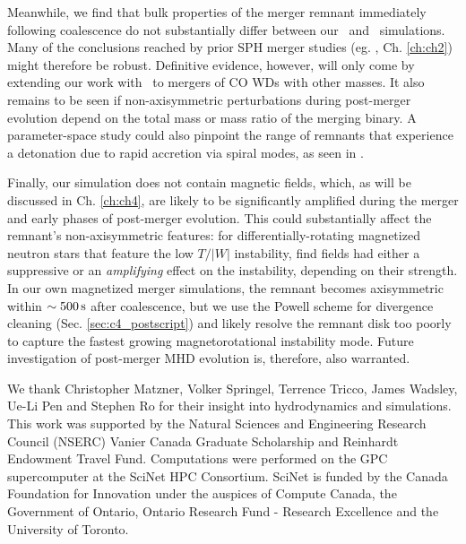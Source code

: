 Meanwhile, we find that bulk properties of the merger remnant immediately following coalescence do not substantially differ between our \gasoline\ and \arepo\ simulations.  Many of the conclusions reached by prior SPH merger studies (eg. \citeal{loreig09}, Ch. \ref{ch:ch2}) might therefore be robust.  Definitive evidence, however, will only come by extending our work with \arepo\ to mergers of CO WDs with other masses.  It also remains to be seen if non-axisymmetric perturbations during post-merger evolution depend on the total mass or mass ratio of the merging binary.  A parameter-space study could also pinpoint the range of remnants that experience a detonation due to rapid accretion via spiral modes, as seen in \cite{kash+15}.


Finally, our simulation does not contain magnetic fields, which, as will be discussed in Ch. \ref{ch:ch4}, are likely to be significantly amplified during the merger and early phases of post-merger evolution.  This could substantially affect the remnant's non-axisymmetric features: for differentially-rotating magnetized neutron stars that feature the low $T/|W|$ instability, \cite{muhl+14} find fields had either a suppressive or an \textit{amplifying} effect on the instability, depending on their strength.  In our own magnetized merger simulations, the remnant becomes axisymmetric within $\sim500\,\mathrm{s}$ after coalescence, but we use the Powell scheme for divergence cleaning (Sec. \ref{sec:c4_postscript}) and likely resolve the remnant disk too poorly to capture the fastest growing magnetorotational instability mode.  Future investigation of post-merger MHD evolution is, therefore, also warranted.

\vspace{10mm}

We thank Christopher Matzner, Volker Springel, Terrence Tricco, James Wadsley, Ue-Li Pen and Stephen Ro for their insight into hydrodynamics and simulations.  This work was supported by the Natural Sciences and Engineering Research Council (NSERC) Vanier Canada Graduate Scholarship and Reinhardt Endowment Travel Fund.  Computations were performed on the GPC supercomputer at the SciNet HPC Consortium.  SciNet \citep{loke+10} is funded by the Canada Foundation for Innovation under the auspices of Compute Canada, the Government of Ontario, Ontario Research Fund - Research Excellence and the University of Toronto.

